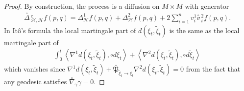 \documentclass[11pt]{article}
\numberwithin{equation}{section}
\newcommand{\Ho}{\mathcal H}
\begin{document}
\begin{proof}
By construction, the process is a diffusion on $M \times M$ with generator
\begin{align*}
\overset{\circ}{\Delta}\,^c_{\Ho,\Ho} f (p,q)=\Delta^1_{\Ho} f (p,q)+\Delta^2_{\Ho} f (p,q) +2 \sum_{i=1}^n v_i^1 \overset{\circ}{v}\,^2_i f(p,q).
\end{align*}
In It\^o's formula the local martingale part of $d(\xi_t,\tilde{\xi}_t)$ is the same as the local martingale part of
\begin{align}\label{quadratic part }
\int_0^t \left\langle \nabla^1 d(\xi_t,\tilde{\xi}_t), \circ d\xi_t \right\rangle +\left\langle \nabla^2 d(\xi_t,\tilde{\xi}_t), \circ d\tilde{\xi}_t \right\rangle
\end{align}
which vanishes since $\nabla^1 d(\xi_t,\tilde{\xi}_t) +\overset{\circ}{\mathfrak{P}}_{\tilde{\xi}_t \to \xi_t}\nabla^2 d(\xi_t,\tilde{\xi}_t)=0$ from the fact that any geodesic satisfies $\overset{\circ}{\nabla}_{\dot \gamma} \dot\gamma=0$.



\end{proof}
\end{document}
